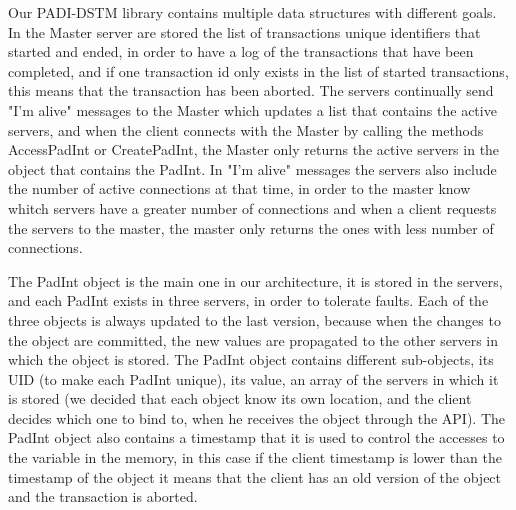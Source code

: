 \documentclass[times, 10pt,twocolumn]{article}
\begin{document}

Our PADI-DSTM library contains multiple data structures with different goals. In the Master server are stored the list of transactions unique identifiers that started and ended, in order to have a log of the transactions that have been completed, and if one transaction id only exists in the list of started transactions, this means that the transaction has been aborted. The servers continually send "I'm alive" messages to the Master which updates a list that contains the active servers, and when the client connects with the Master by calling the methods AccessPadInt or CreatePadInt, the Master only returns the active servers in the object that contains the PadInt. In "I'm alive" messages the servers also include the number of active connections at that time, in order to the master know whitch servers have a greater number of connections and when a client requests the servers to the master, the master only returns the ones with less number of connections.  

The PadInt object is the main one in our architecture, it is stored in the servers, and each PadInt exists in three servers, in order to tolerate faults. Each of the three objects is always updated to the last version, because when the changes to the object are committed, the new values are propagated to the other servers in which the object is stored. The PadInt object contains different sub-objects, its UID (to make each PadInt unique), its value, an array of the servers in which it is stored (we decided that each object know its own location, and the client decides which one to bind to, when he receives the object through the API). The PadInt object also contains a timestamp that it is used to control the accesses to the variable in the memory, in this case if the client timestamp is lower than the timestamp of the object it means that the client has an old version of the object and the transaction is aborted.

\end{document}

